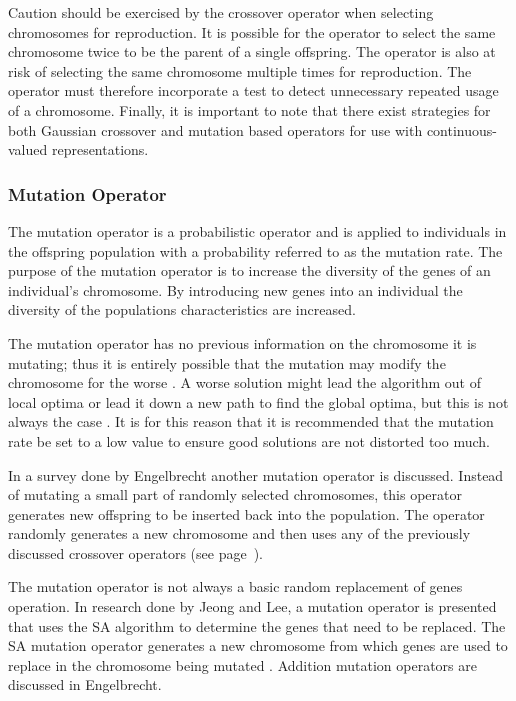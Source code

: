 Caution should be exercised by the crossover operator when selecting chromosomes for reproduction. It is possible for the operator to select the same chromosome twice to be the parent of a single offspring\cite{CompuIntelligenceIntro}. The operator is also at risk of selecting the same chromosome multiple times for reproduction\cite{CompuIntelligenceIntro}. The operator must therefore incorporate a test to detect unnecessary repeated usage of a chromosome\cite{CompuIntelligenceIntro}. Finally, it is important to note that there exist strategies for both Gaussian crossover and mutation based operators for use with continuous-valued representations\cite{FundamentalSwarm}.

\subsubsection{Mutation Operator}
The mutation operator is a probabilistic operator and is applied to individuals in the offspring population with a probability referred to as the mutation rate\cite{CompuIntelligenceIntro}. The purpose of the mutation operator is to increase the diversity of the genes of an individual's chromosome\cite{CompuIntelligenceIntro}. By introducing new genes into an individual the diversity of the populations characteristics are increased\cite{CoactiveFuzzyGA,AcceleratingGA,ConstrainedGA}.

The mutation operator has no previous information on the chromosome it is mutating; thus it is entirely possible that the mutation may modify the chromosome for the worse \cite{AcceleratingGA}. A worse solution might lead the algorithm out of local optima or lead it down a new path to find the global optima, but this is not always the case \cite{AdaptiveSAGA,FamilyGA,ConstrainedGA}. It is for this reason that it is recommended that the mutation rate be set to a low value to ensure good solutions are not distorted too much\cite{CompuIntelligenceIntro}.

In a survey done by Engelbrecht\cite{CompuIntelligenceIntro} another mutation operator is discussed. Instead of mutating a small part of randomly selected chromosomes, this operator generates new offspring to be inserted back into the population. The operator randomly generates a new chromosome and then uses any of the previously discussed crossover operators (see page~\pageref{sec:crossover}).

The mutation operator is not always a basic random replacement of genes operation. In research done by Jeong and Lee\cite{AdaptiveSAGA}, a mutation operator is presented that uses the \gls{SA} algorithm to determine the genes that need to be replaced. The \gls{SA} mutation operator generates a new chromosome from which genes are used to replace in the chromosome being mutated \cite{AdaptiveSAGA}. Addition mutation operators are discussed in Engelbrecht\cite{CompuIntelligenceIntro}.
